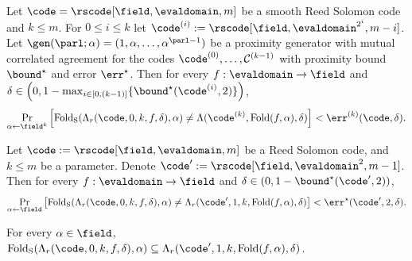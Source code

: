 \begin{theorem}\label{thm:folding_preserves_listdecoding}
    Let $\code = \rscode[\field, \evaldomain, m]$ be a smooth Reed Solomon code and $k \leq m$. For $0 \leq i \leq k$ let $\code^{(i)} := \rscode[\field, \evaldomain^{2^i}, m - i]$. Let $\gen(\parl; \alpha) = (1, \alpha, \ldots, \alpha^{\parl - 1})$ be a proximity generator with mutual correlated agreement for the codes $\code^{(0)}, \ldots, \mathcal{C}^{(k-1)}$ with proximity bound ${\bound}^\star$ and error $\err^\star$. Then for every $f : \evaldomain \to \field$ and $\delta \in \left(0, 1 - \max_{i \in [0,(k-1)]} \{ {\bound}^\star(\code^{(i)}, 2) \} \right)$,
    \[
    \Pr_{\alpha \leftarrow \field^k} \left[
    \mathrm{Fold_S}(\Lambda_{r}(\code, 0, k, f, \delta), \alpha)
    \neq \Lambda(\code^{(k)}, \mathrm{Fold}(f, \alpha), \delta)
    \right] < \err^{(k)}(\code, \delta).
    \]
\end{theorem}

\begin{lemma}\label{lemma:folding_preserves_listdecoding_base}
    Let $\code := \rscode[\field, \evaldomain, m]$ be a Reed Solomon code, and $k \leq m$ be a parameter. Denote $\code' := \rscode[\field, \evaldomain^{2}, m - 1]$. Then for every $f : \evaldomain \to \field$ and $\delta \in (0, 1 - {\bound}^\star(\code', 2))$,
    \[
    \Pr_{\alpha \leftarrow \field} \left[
    \mathrm{Fold_S}(\Lambda_{r}(\code, 0, k, f, \delta), \alpha)
    \neq \Lambda_{r}(\code', 1, k, \mathrm{Fold}(f, \alpha), \delta)
    \right] < \err^\star(\code', 2, \delta).
    \]
\end{lemma}
    
\begin{lemma}\label{lemma:folding_preserves_listdecoding_bound}
    For every $\alpha \in \field$, $\mathrm{Fold_S}(\Lambda_{r}(\code, 0, k, f, \delta), \alpha) \subseteq \Lambda_{r}(\code', 1, k, \mathrm{Fold}(f, \alpha), \delta)$.
\end{lemma}

